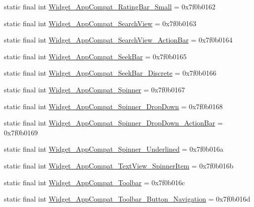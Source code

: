 \begin{CompactItemize}
\item 
static final int \hyperlink{classandroid_1_1support_1_1v7_1_1appcompat_1_1_r_1_1style_3c4803cd821c95a2e5a38b469eb1a9bf}{Widget\_\-AppCompat\_\-RatingBar\_\-Small} = 0x7f0b0162
\item 
static final int \hyperlink{classandroid_1_1support_1_1v7_1_1appcompat_1_1_r_1_1style_2340950fdc651c3fc4ef1abf56cb2a62}{Widget\_\-AppCompat\_\-SearchView} = 0x7f0b0163
\item 
static final int \hyperlink{classandroid_1_1support_1_1v7_1_1appcompat_1_1_r_1_1style_406c690f3c28fe02ec234af219420614}{Widget\_\-AppCompat\_\-SearchView\_\-ActionBar} = 0x7f0b0164
\item 
static final int \hyperlink{classandroid_1_1support_1_1v7_1_1appcompat_1_1_r_1_1style_b2dfc99b9a6277f090b73d7b485ad623}{Widget\_\-AppCompat\_\-SeekBar} = 0x7f0b0165
\item 
static final int \hyperlink{classandroid_1_1support_1_1v7_1_1appcompat_1_1_r_1_1style_13b1f3462a641becc280565b7c996805}{Widget\_\-AppCompat\_\-SeekBar\_\-Discrete} = 0x7f0b0166
\item 
static final int \hyperlink{classandroid_1_1support_1_1v7_1_1appcompat_1_1_r_1_1style_de6ef84f4f5c3d274a7494f599a733d4}{Widget\_\-AppCompat\_\-Spinner} = 0x7f0b0167
\item 
static final int \hyperlink{classandroid_1_1support_1_1v7_1_1appcompat_1_1_r_1_1style_5bfdbd16b955955fd2415e772d5e6bbc}{Widget\_\-AppCompat\_\-Spinner\_\-DropDown} = 0x7f0b0168
\item 
static final int \hyperlink{classandroid_1_1support_1_1v7_1_1appcompat_1_1_r_1_1style_4994b41f35b46122ee10ef066b88ddb5}{Widget\_\-AppCompat\_\-Spinner\_\-DropDown\_\-ActionBar} = 0x7f0b0169
\item 
static final int \hyperlink{classandroid_1_1support_1_1v7_1_1appcompat_1_1_r_1_1style_852c140e6e2a77e8284ded97b5d3cde9}{Widget\_\-AppCompat\_\-Spinner\_\-Underlined} = 0x7f0b016a
\item 
static final int \hyperlink{classandroid_1_1support_1_1v7_1_1appcompat_1_1_r_1_1style_17e663de4284e9829d97a00cbd293f64}{Widget\_\-AppCompat\_\-TextView\_\-SpinnerItem} = 0x7f0b016b
\item 
static final int \hyperlink{classandroid_1_1support_1_1v7_1_1appcompat_1_1_r_1_1style_5a4c69584974a5b73c8915a7deca950c}{Widget\_\-AppCompat\_\-Toolbar} = 0x7f0b016c
\item 
static final int \hyperlink{classandroid_1_1support_1_1v7_1_1appcompat_1_1_r_1_1style_98d64a744babe3154cacd19d695db378}{Widget\_\-AppCompat\_\-Toolbar\_\-Button\_\-Navigation} = 0x7f0b016d

\end{CompactItemize}

